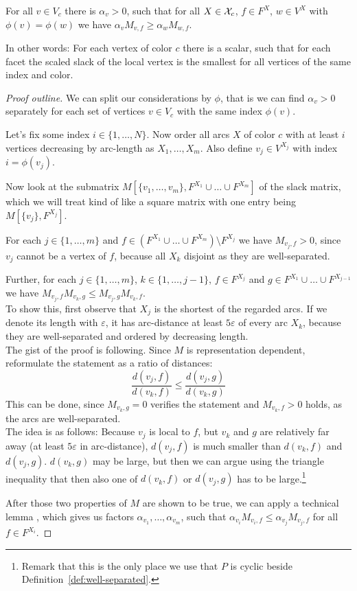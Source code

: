 \begin{lemma}\label{lemma:alphas}
  For all $v \in V_c$ there is $\alpha_v > 0$, such that for all $X \in \mathcal{X}_c$, $f \in F^X$, $w \in V^X$ with $\phi(v)=\phi(w)$ we have $\alpha_v M_{v,f} \geq \alpha_w M_{w,f}$.
\end{lemma}

In other words: For each vertex of color $c$ there is a scalar, such that for each facet the scaled slack of the local vertex is the smallest for all vertices of the same index and color.

\begin{proof}[Proof outline]
  We can split our considerations by $\phi$, that is we can find $\alpha_v > 0$ separately for each set of vertices $v \in V_c$ with the same index $\phi(v)$.

  Let's fix some index $i \in \{1,\dots,N\}$. Now order all arcs $X$ of color $c$ with at least $i$ vertices decreasing by arc-length as $X_1,\dots,X_m$. Also define $v_j \in V^{X_j}$ with index $i = \phi(v_j)$.

  Now look at the submatrix $M \left[ \{v_1, \dots, v_m\},F^{X_1} \cup \dots \cup F^{X_m} \right]$ of the slack matrix, which we will treat kind of like a square matrix with one entry being $M \left[ \{v_j\},F^{X_j} \right]$.

  For each $j \in \{1,\dots,m\}$ and $f \in (F^{X_1} \cup \dots \cup F^{X_m}) \setminus F^{X_j}$ we have $M_{v_j, f} > 0$, since $v_j$ cannot be a vertex of $f$, because all $X_k$ disjoint as they are well-separated.

  Further, for each $j \in \{1,\dots,m\}$, $k \in \{1,\dots,j-1\}$, $f \in F^{X_j}$ and $g \in F^{X_1} \cup \dots \cup F^{X_{j-1}}$ we have $M_{v_j,f}M_{v_k,g} \leq M_{v_j,g}M_{v_k,f}$. \\
  To show this, first observe that $X_j$ is the shortest of the regarded arcs. If we denote its length with $\varepsilon$, it has arc-distance at least $5\varepsilon$ of every arc $X_k$, because they are well-separated and ordered by decreasing length.\\
  The gist of the proof is following. Since $M$ is representation dependent, reformulate the statement as a ratio of distances:
  $$\frac{d(v_j,f)}{d(v_k,f)} \leq \frac{d(v_j,g)}{d(v_k,g)}$$
  This can be done, since $M_{v_k,g} = 0$ verifies the statement and $M_{v_k,f} > 0$ holds, as the arcs are well-separated.\\
  The idea is as follows: Because $v_j$ is local to $f$, but $v_k$ and $g$ are relatively far away (at least $5\varepsilon$ in arc-distance), $d(v_j,f)$ is much smaller than $d(v_k,f)$ and $d(v_j,g)$. $d(v_k,g)$ may be large, but then we can argue using the triangle inequality that then also one of $d(v_k,f)$ or $d(v_j,g)$ has to be large.\footnote{Remark that this is the only place we use that $P$ is cyclic beside Definition~\ref{def:well-separated}.}

  After those two properties of $M$ are shown to be true, we can apply a technical lemma \cite[Lemma~10.3]{kwan2020extension}, which gives us factors $\alpha_{v_1}, \dots, \alpha_{v_m}$, such that $\alpha_{v_i} M_{v_i,f} \leq \alpha_{v_j} M_{v_j,f}$ for all $f \in F^{X_i}$.
\end{proof}


